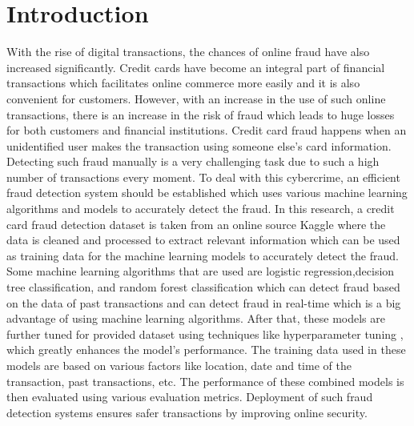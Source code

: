 \chapter{Introduction}
\label{ch:into} %

With the rise of digital transactions, the chances of online fraud have also increased 
significantly. Credit cards have become an integral part of financial transactions which facilitates online commerce more easily and it is also convenient for customers. However, with an increase in the use of such online transactions, there is an increase in the risk of fraud which leads to huge losses for both customers and financial institutions. Credit card fraud happens when an unidentified user makes the transaction using someone else’s card information.
Detecting such fraud manually is a very challenging task due to such a high number of transactions every moment. To deal with this cybercrime, an efficient fraud detection system \citep{Dornadula-2019} should be established which uses various machine learning algorithms and models to accurately detect the fraud. In this research, a credit card fraud detection dataset  is taken from an online source Kaggle \citep{Kaggle}  where the data is cleaned and processed to extract relevant information which can be used as training data for the machine learning models to accurately detect the fraud. Some machine learning algorithms \citep{Shah-2023} that are used are logistic regression,decision tree classification, and random forest classification which can detect fraud based on the data of past transactions and can detect fraud in real-time which is a big advantage of using machine learning algorithms. After that, these models are further tuned for provided dataset  using techniques like hyperparameter tuning \citep{Dalal-2022} , which greatly enhances the model's performance. The training data used in these models are based on various factors like location, date and time of the transaction, past transactions, etc. The performance of these combined models is then evaluated using various evaluation metrics. Deployment of such fraud detection systems ensures safer transactions by improving online security.





